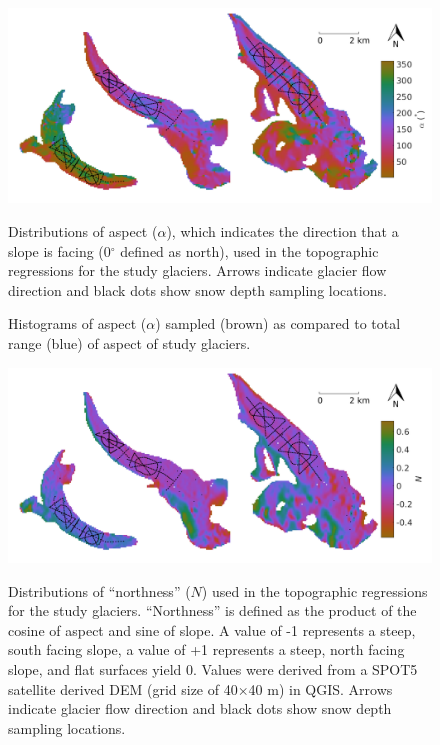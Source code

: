 \documentclass[12pt]{article}
\newcommand{\topomap}{Arrows indicate glacier flow direction and black dots show snow depth sampling locations.}
\begin{document}
\begin{figure}[H]
	\centering
	\includegraphics[width=\textwidth]{Map_aspect.png}\\
	\caption{Distributions of aspect ($\alpha$), which indicates the direction that a slope is facing (0${^\circ}$ defined as north), used in the topographic regressions for the study glaciers. \topomap}
	\label{map:aspect}
\end{figure}

\begin{figure}[H]
	\caption{Histograms of aspect ($\alpha$) sampled (brown) as compared to total range (blue) of aspect of study glaciers.}
	\label{sampledRange:aspect}
\end{figure}

\begin{figure}[H]
	\centering
	\includegraphics[width=\textwidth]{Map_northness.png}\\
	\caption{Distributions of ``northness'' ($N$) used in the topographic regressions for the study glaciers. ``Northness'' is defined as the product of the cosine of aspect and sine of slope. A value of -1 represents a steep, south facing slope, a value of +1 represents a steep, north facing slope, and flat surfaces yield 0. Values were derived from a SPOT5 satellite derived DEM (grid size of 40$\times$40 m) in QGIS. \topomap}
	\label{map:northness}
\end{figure}
\end{document}
